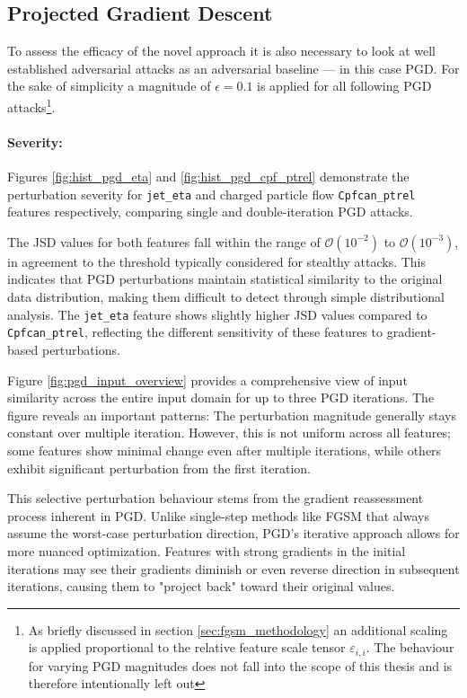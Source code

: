 \subsection{Projected Gradient Descent}

To assess the efficacy of the novel approach it is also necessary to look at well established adversarial attacks as an adversarial baseline — in this case PGD. For the sake of simplicity a magnitude of $\epsilon=0.1$ is applied for all following PGD attacks\footnote{As briefly discussed in section \ref{sec:fgsm_methodology} an additional scaling is applied proportional to the relative feature scale tensor $\varepsilon_{i,i}$. The behaviour for varying PGD magnitudes does not fall into the scope of this thesis and is therefore intentionally left out}.

\paragraph{Severity:} Figures \ref{fig:hist_pgd_eta} and \ref{fig:hist_pgd_cpf_ptrel} demonstrate the perturbation severity for \texttt{jet\_eta} and charged particle flow \texttt{Cpfcan\_ptrel} features respectively, comparing single and double-iteration PGD attacks.

The JSD values for both features fall within the range of $\mathcal{O}(10^{-2})$ to $\mathcal{O}(10^{-3})$, in agreement to the threshold typically considered for stealthy attacks. This indicates that PGD perturbations maintain statistical similarity to the original data distribution, making them difficult to detect through simple distributional analysis. The \texttt{jet\_eta} feature shows slightly higher JSD values compared to \texttt{Cpfcan\_ptrel}, reflecting the different sensitivity of these features to gradient-based perturbations.

Figure \ref{fig:pgd_input_overview} provides a comprehensive view of input similarity across the entire input domain for up to three PGD iterations. The figure reveals an important patterns: The perturbation magnitude generally stays constant over multiple iteration. However, this is not uniform across all features; some features show minimal change even after multiple iterations, while others exhibit significant perturbation from the first iteration.

This selective perturbation behaviour stems from the gradient reassessment process inherent in PGD. Unlike single-step methods like FGSM that always assume the worst-case perturbation direction, PGD's iterative approach allows for more nuanced optimization. Features with strong gradients in the initial iterations may see their gradients diminish or even reverse direction in subsequent iterations, causing them to "project back" toward their original values.

